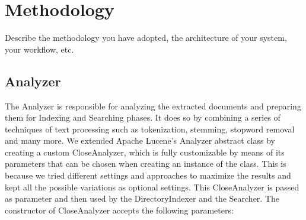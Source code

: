 \section{Methodology}
\label{sec:methodology}

Describe the methodology you have adopted, the architecture of your system, your workflow, etc.





\subsection{Analyzer}
The Analyzer is responsible for analyzing the extracted documents and preparing them for Indexing and Searching phases. It does so by combining a series of techniques of text processing such as tokenization, stemming, stopword removal and many more.
\newline
We extended Apache Lucene's Analyzer abstract class by creating a custom CloseAnalyzer, which is fully customizable by means of its parameters that can be chosen when creating an instance of the class. This is because we tried different settings and approaches to maximize the results and kept all the possible variations as optional settings.
This CloseAnalyzer is passed as parameter and then used by the DirectoryIndexer and the Searcher.
\newline
The constructor of CloseAnalyzer accepts the following parameters:
